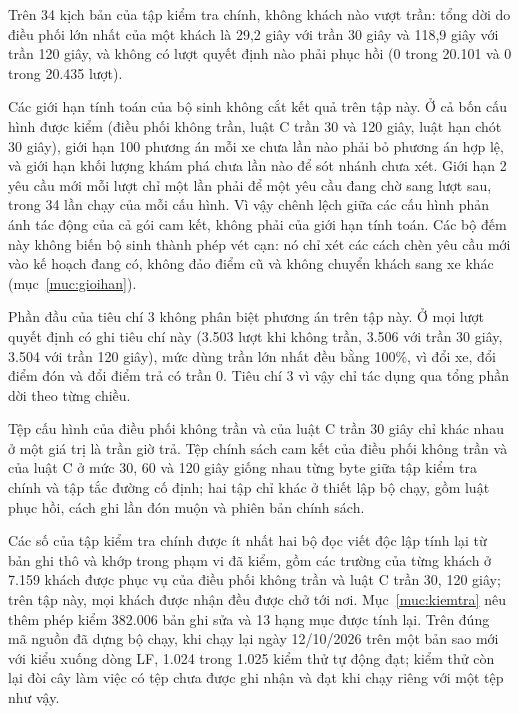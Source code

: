 Trên 34 kịch bản của tập kiểm tra chính, không khách nào vượt trần: tổng dời do điều phối lớn nhất của một khách là
29,2 giây với trần 30 giây và 118,9 giây với trần 120 giây, và không có lượt quyết định nào phải phục hồi (0 trong
20.101 và 0 trong 20.435 lượt).

Các giới hạn tính toán của bộ sinh không cắt kết quả trên tập này. Ở cả bốn cấu hình được kiểm (điều phối không
trần, luật C trần 30 và 120 giây, luật hạn chót 30 giây), giới hạn 100 phương án mỗi xe chưa lần nào phải bỏ phương
án hợp lệ, và giới hạn khối lượng khám phá chưa lần nào để sót nhánh chưa xét. Giới hạn 2 yêu cầu mới mỗi lượt chỉ
một lần phải để một yêu cầu đang chờ sang lượt sau, trong 34 lần chạy của mỗi cấu hình. Vì vậy chênh lệch giữa các
cấu hình phản ánh tác động của cả gói cam kết, không phải của giới hạn tính toán. Các bộ đếm này không biến bộ sinh
thành phép vét cạn: nó chỉ xét các cách chèn yêu cầu mới vào kế hoạch đang có, không đảo điểm cũ và không chuyển
khách sang xe khác (mục~\ref{muc:gioihan}).

Phần đầu của tiêu chí 3 không phân biệt phương án trên tập này. Ở mọi lượt quyết định có ghi tiêu chí này (3.503
lượt khi không trần, 3.506 với trần 30 giây, 3.504 với trần 120 giây), mức dùng trần lớn nhất đều bằng 100\%, vì đổi
xe, đổi điểm đón và đổi điểm trả có trần 0. Tiêu chí 3 vì vậy chỉ tác dụng qua tổng phần dời theo từng chiều.

Tệp cấu hình của điều phối không trần và của luật C trần 30 giây chỉ khác nhau ở một giá trị là trần giờ trả. Tệp
chính sách cam kết của điều phối không trần và của luật C ở mức 30, 60 và 120 giây giống nhau từng byte giữa tập kiểm
tra chính và tập tắc đường cố định; hai tập chỉ khác ở thiết lập bộ chạy, gồm luật phục hồi, cách ghi lần đón muộn
và phiên bản chính sách.

Các số của tập kiểm tra chính được ít nhất hai bộ đọc viết độc lập tính lại từ bản ghi thô và khớp trong phạm vi đã
kiểm, gồm các trường của từng khách ở 7.159 khách được phục vụ của điều phối không trần và luật C trần 30, 120 giây;
trên tập này, mọi khách được nhận đều được chở tới nơi. Mục~\ref{muc:kiemtra} nêu thêm phép kiểm 382.006 bản ghi sửa
và 13 hạng mục được tính lại. Trên đúng mã nguồn đã dựng bộ chạy, khi chạy lại ngày 12/10/2026 trên một bản sao mới
với kiểu xuống dòng LF, 1.024 trong 1.025 kiểm thử tự động đạt; kiểm thử còn lại đòi cây làm việc có tệp chưa được
ghi nhận và đạt khi chạy riêng với một tệp như vậy.

